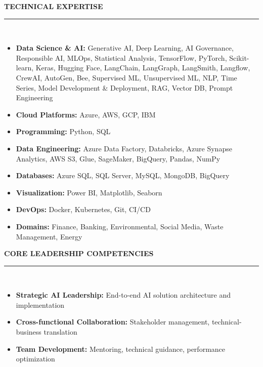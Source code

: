 \documentclass[a4paper,9pt]{article}
\newcommand{\cvsection}[2]{%
  \vspace{4pt}
  {\color{primary}\faIcon{#1}\hspace{6pt}\textbf{\fontsize{10pt}{12pt}\selectfont\uppercase{#2}}}\\[-2pt]
  \color{primary}\rule{\linewidth}{0.8pt}\\[-2pt]
  \color{textcolor}
}
\begin{document}
\begin{paracol}{2}
  \cvsection{tools}{Technical Expertise}
  \small
  \begin{itemize}
    \item \textbf{Data Science \& AI:} Generative AI, Deep Learning, AI Governance, Responsible AI, MLOps, Statistical Analysis, TensorFlow, PyTorch, Scikit-learn, Keras, Hugging Face, LangChain, LangGraph, LangSmith, Langflow, CrewAI, AutoGen, Bee, Supervised ML, Unsupervised ML, NLP, Time Series, Model Development \& Deployment, RAG, Vector DB, Prompt Engineering
    \item \textbf{Cloud Platforms:} Azure, AWS, GCP, IBM
    \item \textbf{Programming:} Python, SQL
    \item \textbf{Data Engineering:} Azure Data Factory, Databricks, Azure Synapse Analytics, AWS S3, Glue, SageMaker, BigQuery, Pandas, NumPy
    \item \textbf{Databases:} Azure SQL, SQL Server, MySQL, MongoDB, BigQuery
    \item \textbf{Visualization:} Power BI, Matplotlib, Seaborn
    \item \textbf{DevOps:} Docker, Kubernetes, Git, CI/CD
    \item \textbf{Domains:} Finance, Banking, Environmental, Social Media, Waste Management, Energy
  \end{itemize}

  \cvsection{star}{Core Leadership Competencies}
  \small
  \begin{itemize}
    \item \textbf{Strategic AI Leadership:} End-to-end AI solution architecture and implementation
    \item \textbf{Cross-functional Collaboration:} Stakeholder management, technical-business translation
    \item \textbf{Team Development:} Mentoring, technical guidance, performance optimization
  \end{itemize}

\end{paracol}
\end{document}
